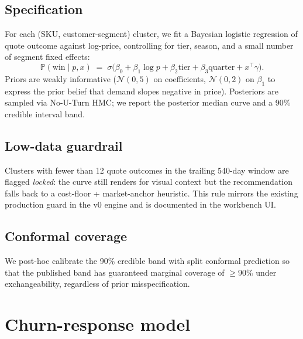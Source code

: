 \documentclass[11pt,a4paper]{article}
\newcommand{\Prob}{\mathbb{P}}
\begin{document}
\subsection{Specification}
For each (SKU, customer-segment) cluster, we fit a Bayesian logistic regression of quote outcome against log-price, controlling for tier, season, and a small number of segment fixed effects:
\begin{equation}
\Prob(\text{win} \mid p, x) \;=\; \sigma\bigl( \beta_0 + \beta_1 \log p + \beta_2 \text{tier} + \beta_3 \text{quarter} + x^\top \gamma \bigr).
\end{equation}
Priors are weakly informative ($\mathcal{N}(0, 5)$ on coefficients, $\mathcal{N}(0, 2)$ on $\beta_1$ to express the prior belief that demand slopes negative in price). Posteriors are sampled via No-U-Turn HMC; we report the posterior median curve and a 90\% credible interval band.

\subsection{Low-data guardrail}
Clusters with fewer than 12 quote outcomes in the trailing 540-day window are flagged \emph{locked}: the curve still renders for visual context but the recommendation falls back to a cost-floor + market-anchor heuristic. This rule mirrors the existing production guard in the v0 engine and is documented in the workbench UI.

\subsection{Conformal coverage}
We post-hoc calibrate the 90\% credible band with split conformal prediction \cite{angelopoulos2021gentle} so that the published band has guaranteed marginal coverage of $\geq 90\%$ under exchangeability, regardless of prior misspecification.

\section{Churn-response model}
\label{sec:churn}
\end{document}
